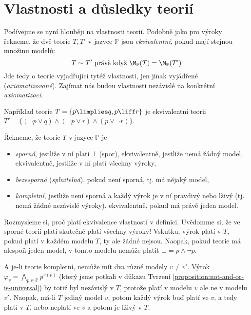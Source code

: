 \section{Vlastnosti a důsledky teorií}

Podívejme se nyní hlouběji na vlastnosti teorií. Podobně jako pro výroky řekneme, že dvě teorie $T,T'$ v jazyce $\mathbb P$ jsou \emph{ekvivalentní}, pokud mají stejnou množinu modelů:
$$
T\sim T' \text{ právě když } \M_\mathbb P(T)=\M_\mathbb P(T')
$$
Jde tedy o teorie vyjadřující tytéž vlastnosti, jen jinak vyjádřené (\emph{axiomatizované}). Zajímat nás budou vlastnosti nezávislé na konkrétní \emph{axiomatizaci}.

\begin{example}
    Například teorie $T=\{p\limplies q,p\liff r\}$ je ekvivalentní teorii $T'=\{(\neg p\lor q)\land(\neg p\lor r)\land(p\lor\neg r)\}$.
\end{example}

\begin{definition}
Řekneme, že teorie $T$ v jazyce $\mathbb P$ je
\begin{itemize}
    \item \emph{sporná}, jestliže v ní platí $\bot$ (spor), ekvivalentně, jestliže nemá žádný model, ekvivalentně, jestliže v ní platí všechny výroky,
    \item \emph{bezesporná} (\emph{splnitelná}), pokud není sporná, tj. má nějaký model,
    \item \emph{kompletní}, jestliže není sporná a každý výrok je v ní pravdivý nebo lživý (tj. nemá žádné nezávislé výroky), ekvivalentně, pokud má právě jeden model.
\end{itemize}    
\end{definition}

Rozmysleme si, proč platí ekvivalence vlastností v definici. Uvědomme si, že ve sporné teorii platí skutečně platí všechny výroky! Vskutku, výrok platí v $T$, pokud platí v každém modelu $T$, ty ale žádné nejsou. Naopak, pokud teorie má alespoň jeden model, v tomto modelu nemůže platit $\bot=p\land\neg p$.

A je-li teorie kompletní, nemůže mít dva různé modely $v\neq v'$. Výrok $\varphi_{v}=\bigwedge_{p\in\mathbb P}p^{v(p)}$ (který jsme potkali v důkazu Tvrzení \ref{proposition:not-and-or-is-universal}) by totiž byl nezávislý v $T$, protože platí v modelu $v$ ale ne v modelu $v'$. Naopak, má-li $T$ jediný model $v$, potom každý výrok buď platí ve $v$, a tedy platí v $T$, nebo neplatí ve $v$ a potom je lživý v $T$.

